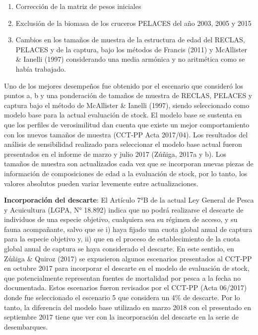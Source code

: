 \documentclass[
  spanish,
]{article}
\providecommand{\tightlist}{%
  \setlength{\itemsep}{0pt}\setlength{\parskip}{0pt}}
\begin{document}
\begin{enumerate}
\def\labelenumi{\alph{enumi})}
\tightlist
\item
  Corrección de la matriz de pesos iniciales
\item
  Exclusión de la biomasa de los cruceros PELACES del año 2003, 2005 y
  2015
\item
  Cambios en los tamaños de muestra de la estructura de edad del RECLAS,
  PELACES y de la captura, bajo los métodos de Francis (2011) y
  McAllister \& Ianelli (1997) considerando una media armónica y no
  aritmética como se había trabajado.
\end{enumerate}

Uno de los mejores desempeños fue obtenido por el escenario que
consideró los puntos a, b y una ponderación de tamaños de muestra de
RECLAS, PELACES y captura bajo el método de McAllister \& Ianelli
(1997), siendo seleccionado como modelo base para la actual evaluación
de stock. El modelo base se sustenta en que los perfiles de
verosimilitud dan cuenta que existe un mejor comportamiento con los
nuevos tamaños de muestra (CCT-PP Acta 2017/04). Los resultados del
análisis de sensibilidad realizado para seleccionar el modelo base
actual fueron presentados en el informe de marzo y julio 2017 (Zúñiga,
2017a y b). Los tamaños de muestra son actualizados cada vez que se
incorporan nuevas piezas de información de composiciones de edad a la
evaluación de stock, por lo tanto, los valores absolutos pueden variar
levemente entre actualizaciones.

\textbf{Incorporación del descarte}: El Artículo 7°B de la actual Ley
General de Pesca y Acuicultura (LGPA, N° 18.892) indica que no podrá
realizarse el descarte de individuos de una especie objetivo, cualquiera
sea su régimen de acceso, y su fauna acompañante, salvo que se i) haya
fijado una cuota global anual de captura para la especie objetivo y, ii)
que en el proceso de establecimiento de la cuota global anual de captura
se haya considerado el descarte. En este sentido, en Zúñiga \& Quiroz
(2017) se expusieron algunos escenarios presentados al CCT-PP en octubre
2017 para incorporar el descarte en el modelo de evaluación de stock,
que potencialmente representan fuentes de mortalidad por pesca a la
fecha no documentada. Estos escenarios fueron revisados por el CCT-PP
(Acta 06/2017) donde fue seleccionado el escenario 5 que considera un
4\% de descarte. Por lo tanto, la diferencia del modelo base utilizado
en marzo 2018 con el presentado en septiembre 2017 tiene que ver con la
incorporación del descarte en la serie de desembarques.
\end{document}
